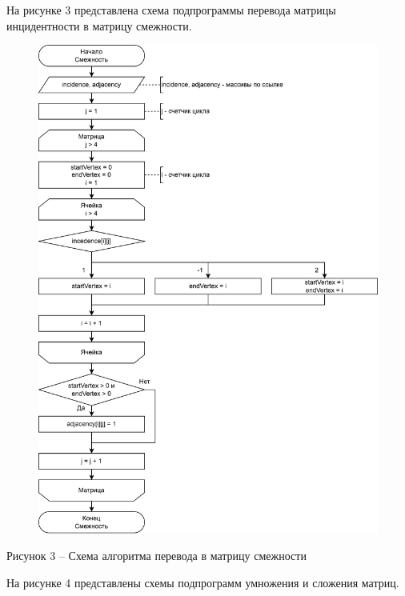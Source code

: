 \documentclass[a4paper,14pt]{extarticle}
\begin{document}
  \pagebreak
  На рисунке 3 представлена схема подпрограммы перевода матрицы инцидентности в матрицу смежности.

  \begin{figure}[h]
    \centering
    \includegraphics[width=0.8\linewidth]{images/s-2.png}
  \end{figure}
  \begin{center}
    Рисунок 3 – Схема алгоритма перевода в матрицу смежности
  \end{center}

  \pagebreak
  На рисунке 4 представлены схемы подпрограмм умножения и сложения матриц.
\end{document}
